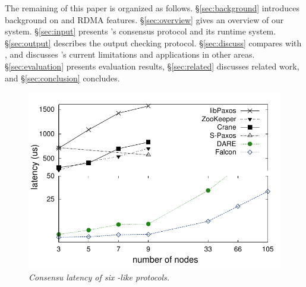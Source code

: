 

The remaining of this paper is organized as follows.
\S\ref{sec:background} introduces background on \paxos and RDMA features.
\S\ref{sec:overview} gives an overview of our \xxx system. \S\ref{sec:input}
presents \xxx's consensus protocol and its runtime system. \S\ref{sec:output}
describes the output checking protocol. \S\ref{sec:discuss} compares \dare with
\xxx, and discusses \xxx's current limitations and applications in other areas.
\S\ref{sec:evaluation} presents evaluation results, \S\ref{sec:related}
discusses related work, and \S\ref{sec:conclusion} concludes.

\begin{figure}[t]
\centering
\vspace{-.10in}
\includegraphics[width=.45\textwidth]{figures/traditional_paxos_latency}
\vspace{-.15in}
\caption{{\em Consensu latency of six \paxos-like protocols.}}
\label{fig:scalability}
\vspace{-.20in}
\end{figure}

